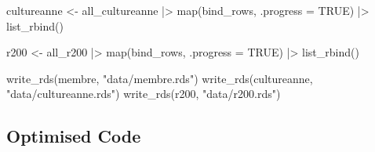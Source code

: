 \documentclass[
  letterpaper,
  DIV=11,
  numbers=noendperiod]{scrreprt}
\newenvironment{Shaded}{\begin{snugshade}}{\end{snugshade}}
\newcommand{\AttributeTok}[1]{\textcolor[rgb]{0.40,0.45,0.13}{#1}}
\newcommand{\ConstantTok}[1]{\textcolor[rgb]{0.56,0.35,0.01}{#1}}
\newcommand{\FunctionTok}[1]{\textcolor[rgb]{0.28,0.35,0.67}{#1}}
\newcommand{\NormalTok}[1]{\textcolor[rgb]{0.00,0.23,0.31}{#1}}
\newcommand{\OtherTok}[1]{\textcolor[rgb]{0.00,0.23,0.31}{#1}}
\newcommand{\SpecialCharTok}[1]{\textcolor[rgb]{0.37,0.37,0.37}{#1}}
\newcommand{\StringTok}[1]{\textcolor[rgb]{0.13,0.47,0.30}{#1}}
\begin{document}
\begin{Shaded}
\begin{Highlighting}[]
\NormalTok{cultureanne }\OtherTok{\textless{}{-}}\NormalTok{ all\_cultureanne }\SpecialCharTok{|\textgreater{}} 
  \FunctionTok{map}\NormalTok{(bind\_rows, }\AttributeTok{.progress =} \ConstantTok{TRUE}\NormalTok{) }\SpecialCharTok{|\textgreater{}}  
  \FunctionTok{list\_rbind}\NormalTok{() }

\NormalTok{r200 }\OtherTok{\textless{}{-}}\NormalTok{ all\_r200 }\SpecialCharTok{|\textgreater{}} 
  \FunctionTok{map}\NormalTok{(bind\_rows, }\AttributeTok{.progress =} \ConstantTok{TRUE}\NormalTok{) }\SpecialCharTok{|\textgreater{}}  
  \FunctionTok{list\_rbind}\NormalTok{() }

\FunctionTok{write\_rds}\NormalTok{(membre, }\StringTok{"data/membre.rds"}\NormalTok{)}
\FunctionTok{write\_rds}\NormalTok{(cultureanne, }\StringTok{"data/cultureanne.rds"}\NormalTok{)}
\FunctionTok{write\_rds}\NormalTok{(r200, }\StringTok{"data/r200.rds"}\NormalTok{)}
\end{Highlighting}
\end{Shaded}

\subsection{Optimised Code}\label{optimised-code}
\end{document}
